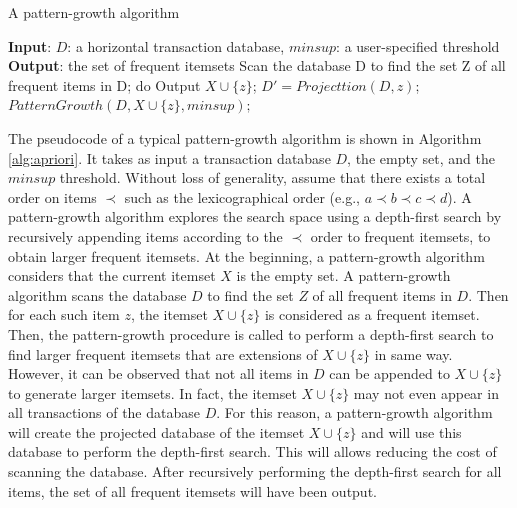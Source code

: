 \begin{algorithm}
    \caption{A pattern-growth algorithm}
    \label{alg:apriori}
    \begin{algorithmic}[1]
        \State \textbf{Input}: $D$: a horizontal transaction database, $minsup$: a user-specified threshold
        \State \textbf{Output}: the set of frequent itemsets
        \State Scan the database D to find the set Z of all frequent items in D;
         do
        \State Output $X \cup \{z\}$; 
        \State $D' = Projecttion(D, z)$; 
        \State $PatternGrowth(D, X \cup \{z\}, minsup);$ 
        \EndFor
    \end{algorithmic}
\end{algorithm}
The pseudocode of a typical pattern-growth algorithm is shown in Algorithm \ref{alg:apriori}.
It takes as input a transaction database $D$, the empty set, and the $minsup$ threshold. Without loss
of generality, assume that there exists a total order on items $\prec$ such as
the lexicographical order (e.g., $a \prec b \prec c \prec d$). A pattern-growth algorithm explores the search space using
a depth-first search by recursively appending items according to the $\prec$ order to frequent
itemsets, to obtain larger frequent itemsets. At the beginning, a pattern-growth algorithm
considers that the current itemset $X$ is the empty set. A pattern-growth algorithm scans the
database $D$ to find the set $Z$ of all frequent items in $D$. Then for each such item $z$,
the itemset $X \cup \{z\}$ is considered as a frequent itemset. Then, the pattern-growth
procedure is called to perform a depth-first search to find larger frequent itemsets that are
extensions of $X \cup \{z\}$ in same way. However, it can be observed that not all items
in $D$ can be appended to $X \cup \{z\}$ to generate larger itemsets. In fact, the itemset
$X \cup \{z\}$ may not even appear in all transactions of the database $D$.
For this reason, a pattern-growth algorithm will create the projected database of the itemset
$X \cup \{z\}$ and will use this database to perform the depth-first search.
This will allows reducing the cost
of scanning the database. After recursively performing the depth-first search for all items,
the set of all frequent itemsets will have been output.

